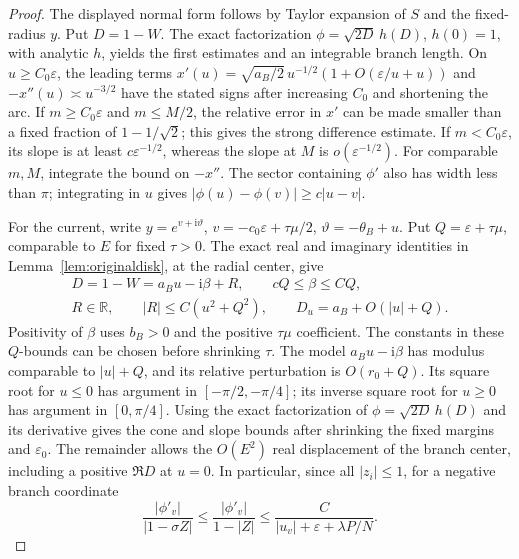 \documentclass[11pt]{article}
\numberwithin{equation}{section}
\theoremstyle{definition}
\newcommand{\ii}{\mathrm i}
\newcommand{\R}{\mathbb R}
\newcommand{\eps}{\varepsilon}
\begin{document}
\begin{proof}
The displayed normal form follows by Taylor expansion of \(S\) and
the fixed-radius \(y\). Put \(D=1-W\).
The exact factorization \(\phi=\sqrt{2D}\,h(D)\), \(h(0)=1\),
with analytic \(h\), yields the first estimates and an integrable
branch length. On \(u\ge C_0\eps\), the leading terms
\(x'(u)=\sqrt{a_B/2}\,u^{-1/2}(1+O(\eps/u+u))\) and
\(-x''(u)\asymp u^{-3/2}\) have the stated signs after increasing
\(C_0\) and shortening the arc.
If \(m\ge C_0\eps\) and \(m\le M/2\), the relative error in
\(x'\) can be made smaller than a fixed fraction of
\(1-1/\sqrt2\); this gives the strong difference estimate.
If \(m<C_0\eps\), its slope is at least \(c\eps^{-1/2}\),
whereas the slope at \(M\) is \(o(\eps^{-1/2})\).
For comparable \(m,M\), integrate the bound on \(-x''\).
The sector containing \(\phi'\) also has width less than \(\pi\);
integrating in \(u\) gives
\(|\phi(u)-\phi(v)|\ge c|u-v|\).

For the current, write \(y=e^{v+\ii\vartheta}\),
\(v=-c_0\eps+\tau \mu/2\), \(\vartheta=-\theta_B+u\).
Put \(Q=\eps+\tau \mu\), comparable to \(E\) for fixed \(\tau>0\).
The exact real and imaginary identities in
Lemma~\ref{lem:originaldisk}, at the radial center, give
\begin{gather*}
 D=1-W=a_Bu-\ii\beta+R,\qquad cQ\le\beta\le CQ,\\
 R\in\R,\qquad |R|\le C(u^2+Q^2),\qquad
 D_u=a_B+O(|u|+Q).
\end{gather*}
Positivity of \(\beta\) uses \(b_B>0\) and the positive
\(\tau \mu\) coefficient. The constants in these \(Q\)-bounds
can be chosen before shrinking \(\tau\). The model
\(a_Bu-\ii\beta\) has modulus comparable to \(|u|+Q\), and
its relative perturbation is \(O(r_0+Q)\). Its square root for \(u\le0\) has argument
in \([-\pi/2,-\pi/4]\); its inverse square root for \(u\ge0\)
has argument in \([0,\pi/4]\). Using the exact factorization
of \(\phi=\sqrt{2D}\,h(D)\) and its derivative gives the cone and
slope bounds after shrinking the fixed margins and \(\eps_0\).
The remainder allows the \(O(E^2)\) real displacement of the branch
center, including a positive \(\Re D\) at \(u=0\).
In particular, since all \(|z_i|\le1\), for a negative branch
coordinate
\[
 \frac{|\phi'_v|}{|1-\sigma Z|}
 \le\frac{|\phi'_v|}{1-|Z|}
 \le\frac C{|u_v|+\eps+\lambda P/N}.
\]
\end{proof}
\end{document}

